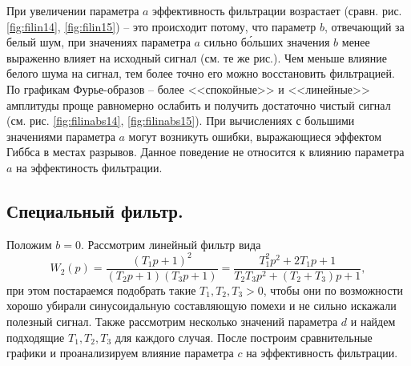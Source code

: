 \documentclass[a4paper, 12pt]{article}
\begin{document}
    
    При увеличении параметра $a$ эффективность фильтрации возрастает (сравн. рис. \ref{fig:filin14}, \ref{fig:filin15}) -- это происходит потому,
    что параметр $b$, отвечающий за белый шум, при значениях параметра $a$ сильно б\'{о}льших значения $b$ менее выраженно влияет на исходный сигнал
    (см. те же рис.). Чем меньше влияние белого шума на сигнал, тем более точно его можно восстановить фильтрацией. По графикам Фурье-образов -- более <<спокойные>> и <<линейные>> амплитуды 
    проще равномерно ослабить и получить достаточно чистый сигнал (см. рис. \ref{fig:filinabs14}, \ref{fig:filinabs15}). При вычислениях с большими
    значениями параметра $a$ могут возникуть ошибки, выражающиеся эффектом Гиббса в местах разрывов. Данное поведение не относится к влиянию параметра
    $a$ на эффектиность фильтрации.


    \subsection{Специальный фильтр.}
    Положим $b=0$. Рассмотрим линейный фильтр вида
    $$W_2(p)=\dfrac{\left(T_1p+1\right)^{2}}{\left(T_2p+1\right)\left(T_3p+1\right)}=\dfrac{T_1^2p^2+2T_1p+1}{T_2T_3p^2+\left(T_2+T_3\right)p+1},$$
    при этом постараемся подобрать такие $T_1,T_2,T_3>0$, чтобы они по возможности хорошо убирали синусоидальную составляющую помехи и не сильно искажали
    полезный сигнал. Также рассмотрим несколько значений параметра $d$ и найдем подходящие $T_1,T_2,T_3$ для каждого случая. После построим сравнительные
    графики и проанализируем влияние параметра $c$ на эффективность фильтрации.
\end{document}
